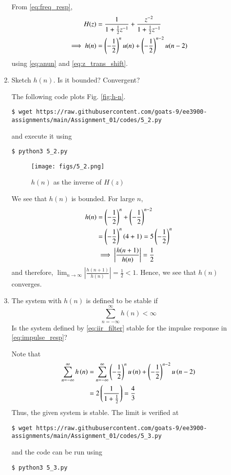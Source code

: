 \documentclass[journal,12pt,twocolumn]{IEEEtran}
\renewcommand\thesection{\arabic{section}}
\begin{document}
\begin{enumerate}[label=\thesection.\arabic*]
\solution From \eqref{eq:freq_resp},
\begin{align}
H(z) &= \frac{1}{1 + \frac{1}{2}z^{-1}} + \frac{ z^{-2}}{1 + \frac{1}{2}z^{-1}} \\
\implies h(n) &= \left(-\frac{1}{2}\right)^{n}u(n) + \left(-\frac{1}{2}\right)^{n-2}u(n-2)
\end{align}
using \eqref{eq:anun} and \eqref{eq:z_trans_shift}.

\item Sketch $h(n)$. Is it bounded? Convergent? 

\solution The following code plots Fig. \eqref{fig:h-n}.
\begin{lstlisting}
$ wget https://raw.githubusercontent.com/goats-9/ee3900-assignments/main/Assignment_01/codes/5_2.py
\end{lstlisting}
and execute it using
\begin{lstlisting}
$ python3 5_2.py
\end{lstlisting}

\begin{figure}[!ht]
	\centering
	\texttt{[image: figs/5\_2.png]}
	\caption{$h(n)$ as the inverse of $H(z)$}
	\label{fig:h-n}
\end{figure}
We see that $h(n)$ is bounded. For large $n$,
\begin{align}
	h(n) &= \left(-\frac{1}{2}\right)^n + \left(-\frac{1}{2}\right)^{n - 2} \\
		 &= \left(-\frac{1}{2}\right)^{n}\left(4 + 1\right) = 5\left(-\frac{1}{2}\right)^n \\
		 &\implies \left|\frac{h(n + 1)}{h(n)}\right| = \frac{1}{2}
\end{align}
and therefore, $\lim_{n \to \infty}\left|\frac{h(n + 1)}{h(n)}\right| = \frac{1}{2} < 1$. Hence, we see that $h(n)$ converges.  
\item The system with $h(n)$ is defined to be stable if
\begin{equation}
\sum_{n=-\infty}^{\infty}h(n) < \infty
\end{equation}
Is the system defined by \eqref{eq:iir_filter} stable for the impulse response in \eqref{eq:impulse_resp}?

\solution
Note that
\begin{align}
	\sum_{n = -\infty}^{\infty}h\left(n\right) &= \sum_{n = -\infty}^{\infty}
	\left(-\frac{1}{2}\right)^nu\left(n\right) + \left(-\frac{1}{2}\right)^{n - 2}u\left(n - 2\right) \\
										 &= 2\left(\frac{1}{1 + \frac{1}{2}}\right) = \frac{4}{3}
\end{align}
Thus, the given system is stable. The limit is verified at
\begin{lstlisting}
$ wget https://raw.githubusercontent.com/goats-9/ee3900-assignments/main/Assignment_01/codes/5_3.py
\end{lstlisting}
and the code can be run using
\begin{lstlisting}
$ python3 5_3.py
\end{lstlisting}


\end{enumerate}
\end{document}

